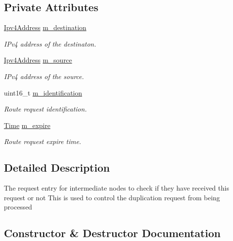 \subsection*{Private Attributes}
\begin{DoxyCompactItemize}
\item 
\hyperlink{classns3_1_1Ipv4Address}{Ipv4\+Address} \hyperlink{classns3_1_1dsr_1_1DsrReceivedRreqEntry_ad0389b4b039801edb2dfd28bec6163a4}{m\+\_\+destination}
\begin{DoxyCompactList}\small\item\em I\+Pv4 address of the destinaton. \end{DoxyCompactList}\item 
\hyperlink{classns3_1_1Ipv4Address}{Ipv4\+Address} \hyperlink{classns3_1_1dsr_1_1DsrReceivedRreqEntry_a374722e0a90fd8d76dd392e7a0a2398e}{m\+\_\+source}
\begin{DoxyCompactList}\small\item\em I\+Pv4 address of the source. \end{DoxyCompactList}\item 
uint16\+\_\+t \hyperlink{classns3_1_1dsr_1_1DsrReceivedRreqEntry_ab7d5d88cd1b38535da33c6bcc71aa562}{m\+\_\+identification}
\begin{DoxyCompactList}\small\item\em Route request identification. \end{DoxyCompactList}\item 
\hyperlink{classns3_1_1Time}{Time} \hyperlink{classns3_1_1dsr_1_1DsrReceivedRreqEntry_aa5ec328db5e19bccccd083ae6b91e91f}{m\+\_\+expire}
\begin{DoxyCompactList}\small\item\em Route request expire time. \end{DoxyCompactList}\end{DoxyCompactItemize}


\subsection{Detailed Description}
The request entry for intermediate nodes to check if they have received this request or not This is used to control the duplication request from being processed 

\subsection{Constructor \& Destructor Documentation}
